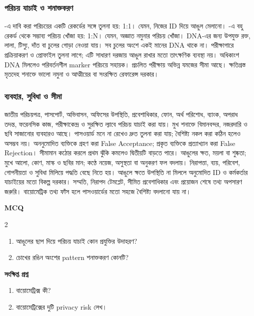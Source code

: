 \subsubsection{পরিচয় যাচাই ও শনাক্তকরণ}
-এ দাবি করা পরিচয়ের একটি রেকর্ডের সঙ্গে তুলনা হয়: 1:1। যেমন, নিজের ID দিয়ে আঙুল মেলানো। -এ বহু রেকর্ড থেকে সম্ভাব্য পরিচয় খোঁজা হয়: 1:N। যেমন, অজ্ঞাত নমুনার পরিচয় খোঁজা।
DNA-এর জন্য উপযুক্ত রক্ত, লালা, টিস্যু, দাঁত বা চুলের গোড়া নেওয়া যায়। সব চুলের অংশে একই মানের DNA থাকে না। পরীক্ষাগারে প্রক্রিয়াকরণ ও প্রোফাইল তুলনা লাগে; এটি সাধারণ দরজায় আঙুল রাখার মতো তাৎক্ষণিক ব্যবস্থা নয়। অধিকাংশ DNA মিললেও পরিবর্তনশীল marker পরিচয়ে সহায়ক। প্রচলিত পরীক্ষায় অভিন্ন যমজের সীমা আছে। ক্ষতিগ্রস্ত মৃতদেহ শনাক্তে ভালো নমুনা ও আত্মীয়ের বা সংরক্ষিত রেফারেন্স দরকার।
\subsubsection{ব্যবহার, সুবিধা ও সীমা}
জাতীয় পরিচয়পত্র, পাসপোর্ট, অভিবাসন, অফিসের উপস্থিতি, প্রবেশাধিকার, ফোন, অর্থ পরিশোধ, ব্যাংক, অপরাধ তদন্ত, ফরেনসিক কাজ, পরীক্ষাকেন্দ্র ও সুরক্ষিত ল্যাবে পরিচয় যাচাই করা যায়। মুখ শনাক্তে বিমানবন্দর, নজরদারি ও ছবি সাজানোর ব্যবহারও আছে। পাসওয়ার্ড মনে না রেখেও দ্রুত তুলনা করা যায়; বৈশিষ্ট্য নকল করা কঠিন হলেও অসম্ভব নয়।
অননুমোদিত ব্যক্তিকে গ্রহণ করা False Acceptance; প্রকৃত ব্যক্তিকে প্রত্যাখ্যান করা False Rejection। সীমামান কঠোর করলে প্রথম ঝুঁকি কমলেও দ্বিতীয়টি বাড়তে পারে। আঙুলের ক্ষত, ময়লা বা শুষ্কতা; মুখে আলো, কোণ, মাস্ক ও ছবির মান; কণ্ঠে নয়েজ, অসুস্থতা বা অনুকরণ ফল বদলায়। নিরাপত্তা, ব্যয়, পরিবেশ, গোপনীয়তা ও সুবিধা মিলিয়ে পদ্ধতি বেছে নিতে হয়।
আঙুলে ক্ষতে উপস্থিতি না মিললে অনুমোদিত ID ও কর্মকর্তার যাচাইয়ের মতো বিকল্প দরকার। সম্মতি, নিরাপদ টেমপ্লেট, সীমিত প্রবেশাধিকার এবং প্রয়োজন শেষে তথ্য অপসারণ জরুরি। বায়োমেট্রিক তথ্য ফাঁস হলে পাসওয়ার্ডের মতো সহজে বৈশিষ্ট্য বদলানো যায় না।
\begin{practicebox}
\textbf{MCQ}
\begin{multicols}{2}\begin{enumerate}
\item \begin{minipage}[t]{\linewidth}আঙুলের ছাপ দিয়ে পরিচয় যাচাই কোন প্রযুক্তির উদাহরণ?\par {}\par\end{minipage}
\item \begin{minipage}[t]{\linewidth}চোখের রঙিন অংশের pattern শনাক্তকরণ কোনটি?\par {}\par\end{minipage}
\end{enumerate}\end{multicols}

\textbf{সংক্ষিপ্ত প্রশ্ন}
\begin{enumerate}
\item বায়োমেট্রিক্স কী?
\item বায়োমেট্রিক্সের দুটি privacy risk লেখ।
\end{enumerate}
\end{practicebox}

